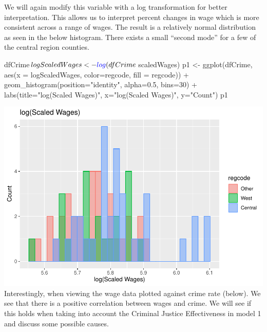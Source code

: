 \documentclass[]{article}
\newenvironment{Shaded}{}{}
\newcommand{\DataTypeTok}[1]{#1}
\newcommand{\DecValTok}[1]{#1}
\newcommand{\FloatTok}[1]{#1}
\newcommand{\KeywordTok}[1]{\textcolor[rgb]{0.00,0.00,1.00}{#1}}
\newcommand{\NormalTok}[1]{#1}
\newcommand{\OperatorTok}[1]{#1}
\newcommand{\StringTok}[1]{\textcolor[rgb]{0.00,0.50,0.50}{#1}}
\begin{document}
We will again modify this variable with a log transformation for better
interpretation. This allows us to interpret percent changes in wage
which is more consistent across a range of wages. The result is a
relatively normal distribution as seen in the below histogram. There
exists a small ``second mode'' for a few of the central region counties.

\begin{Shaded}
\begin{Highlighting}[]
\NormalTok{dfCrime}\OperatorTok{$}\NormalTok{logScaledWages <-}\StringTok{ }\KeywordTok{log}\NormalTok{(dfCrime}\OperatorTok{$}\NormalTok{scaledWages)}
\NormalTok{p1 <-}\StringTok{ }\KeywordTok{ggplot}\NormalTok{(dfCrime, }\KeywordTok{aes}\NormalTok{(}\DataTypeTok{x =}\NormalTok{ logScaledWages, }\DataTypeTok{color=}\NormalTok{regcode, }\DataTypeTok{fill =}\NormalTok{ regcode)) }\OperatorTok{+}\StringTok{ }
\StringTok{  }\KeywordTok{geom_histogram}\NormalTok{(}\DataTypeTok{position=}\StringTok{"identity"}\NormalTok{, }\DataTypeTok{alpha=}\FloatTok{0.5}\NormalTok{, }\DataTypeTok{bins=}\DecValTok{30}\NormalTok{) }\OperatorTok{+}
\StringTok{  }\KeywordTok{labs}\NormalTok{(}\DataTypeTok{title=}\StringTok{"log(Scaled Wages)"}\NormalTok{, }\DataTypeTok{x=}\StringTok{"log(Scaled Wages)"}\NormalTok{, }\DataTypeTok{y=}\StringTok{"Count"}\NormalTok{)}
\NormalTok{p1}
\end{Highlighting}
\end{Shaded}

\includegraphics{Bagnard_Gaustad_Hartman_Leung_Lab_3_files/figure-latex/unnamed-chunk-58-1.pdf}
Interestingly, when viewing the wage data plotted against crime rate
(below). We see that there is a positive correlation between wages and
crime. We will see if this holds when taking into account the Criminal
Justice Effectiveness in model 1 and discuss some possible causes.
\end{document}
